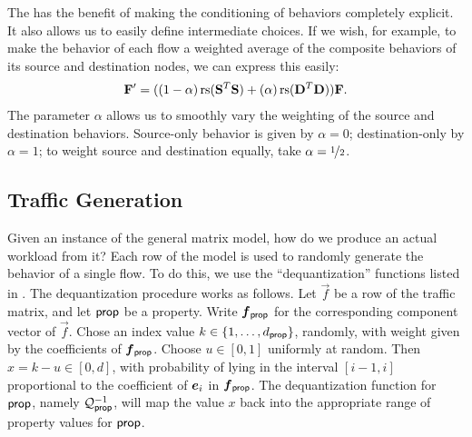 \documentclass[twocolumn,final]{svjour3}
\begin{document}
The  has the benefit of making the conditioning of behaviors completely explicit. It also allows us to easily define intermediate choices. If we wish, for example, to make the behavior of each flow a weighted average of the composite behaviors of its source and destination nodes, we can express this easily:
\begin{align}
\mathbf{F}' = ((1-\alpha)\,\text{rs}({\mathbf{S}}^T\mathbf{S})+(\alpha)\,\text{rs}({\mathbf{D}}^T\mathbf{D}))\mathbf{F}.
\end{align}
The parameter $\alpha$ allows us to smoothly vary the weighting of the source and destination behaviors. Source-only behavior is given by $\alpha=0$; destination-only by $\alpha=1$; to weight source and destination equally, take $\alpha=\nicefrac{1}{2}$.

\subsection{Traffic Generation}

Given an instance of the general matrix model, how do we produce an actual workload from it?
Each row of the model is used to randomly generate the behavior of a single flow.
To do this, we use the ``dequantization'' functions listed in .
The dequantization procedure works as follows.
Let $\vec{f}$
be a row of the traffic matrix, and let $\text{\textsf{prop}}$ be a property.
Write $\vec{f}_\prop$ for the corresponding component vector of $\vec{f}$.
Chose an index value $k\in{\left\{1,\dots,d_{\text{\textsf{prop}}}\right\}}$, randomly, with weight given by the coefficients of $\vec{f}_\prop$.
Choose $u \in [0,1]$ uniformly at random.
Then $x = k-u \in [0,d]$, with probability of lying in the interval $[i-1,i]$ proportional to the coefficient of $\e_i$ in $\vec{f}_\prop$.
The dequantization function for $\text{\textsf{prop}}$, namely $\mathcal{Q}^{-1}_{\text{\textsf{prop}}}$, will map the value $x$ back into the appropriate range of property values for $\text{\textsf{prop}}$.
\end{document}
